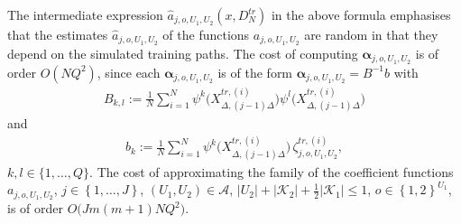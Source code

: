 \documentclass[11pt,a4paper]{amsart}
\theoremstyle{plain}
\theoremstyle{definition}
\theoremstyle{remark}
\numberwithin{equation}{section}
\renewcommand*{\doteq}{:=}
\begin{document}
The intermediate expression
$\hat a_{j,o,U_1,U_2}(x,D_N^{tr})$
in the above formula
emphasises that the estimates
$\hat a_{j,o,U_1,U_2}$
of the functions $a_{j,o,U_1,U_2}$
are random in that they depend on
the simulated training paths.
The cost of computing
$\boldsymbol{\alpha}_{j,o,U_1,U_2}$ is of order $O(NQ^{2})$,
 since each \ensuremath{\boldsymbol{\alpha}_{j,o,U_1,U_2}}
 is of the form \ensuremath{\boldsymbol{\alpha}_{j,o,U_1,U_2}=B^{-1}b}
 with 
\begin{align}
\label{b_matr_reg}
B_{k,l}\doteq\frac{1}{N}\sum_{i=1}^{N}\psi^{k}\bigl(X_{\Delta,(j-1)\Delta}^{tr,(i)}\bigr)\psi^{l}\bigl(X_{\Delta,(j-1)\Delta}^{tr,(i)}\bigr)
\end{align}
and 
\begin{align*}
b_{k}\doteq\frac{1}{N}\sum_{i=1}^{N}\psi^{k}\bigl(X_{\Delta,(j-1)\Delta}^{tr,(i)}\bigr)\,\zeta_{j,o,U_1,U_2}^{tr,(i)},
\end{align*}
\ensuremath{k,l\in\{1,\ldots,Q\}.} The cost of approximating the family of the coefficient functions $a_{j,o,U_1,U_2}$, $j\in\left\{1,\ldots, J\right\}$, $(U_1,U_2)\in\mathcal{A}$, $\left|U_2\right|+\left|\mathcal{K}_2\right|+\frac{1}{2}\left|\mathcal{K}_1\right|\le 1$, $o\in\left\{1,2\right\}^{U_1}$, is of order
$O\bigl(Jm(m+1)NQ^{2}\bigr)$.
\end{document}
